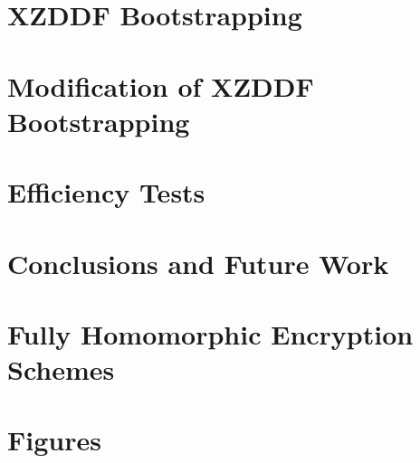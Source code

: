 \documentclass[11pt,twoside]{latex_config/eitExjobb}               %
\begin{document}
%


\chapter{XZDDF Bootstrapping}\label{sec:xzddf_intro}


\chapter{Modification of XZDDF Bootstrapping}\label{sec:xzddf_corr}



\chapter{Efficiency Tests}\label{sec:efficiency_tests}



\chapter{Conclusions and Future Work}\label{sec:conclusions}






\appendix

\chapter{Fully Homomorphic Encryption Schemes}\label{sec:fhe_schemes}


\chapter{Figures}\label{sec:appendix_figures}

\end{document}
